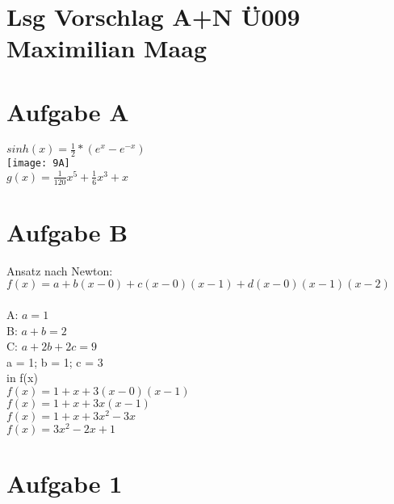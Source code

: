\documentclass{article}
\begin{document}
	\section*{Lsg Vorschlag A+N Ü009 Maximilian Maag}
	\section*{Aufgabe A}
	$sinh(x) = \frac{1}{2}*(e^x - e^{-x})$ \\
	\texttt{[image: 9A]} \\
	$g(x) = \frac{1}{120}x^5 + \frac{1}{6}x^3 + x$
	\section*{Aufgabe B}
	Ansatz nach Newton: \\
	$f(x) = a + b(x-0) + c(x-0)(x-1) + d(x-0)(x-1)(x-2)$ \\
	\\
	A: $a = 1$ \\
	B: $a + b = 2$ \\
	C: $a + 2b + 2c = 9$ \\
	a = 1; b = 1; c = 3 \\
	in f(x) \\
	$f(x) = 1 + x + 3(x-0)(x-1)$ \\
	$f(x) = 1 + x + 3x(x-1)$ \\
	$f(x) = 1 + x + 3x^2 -3x$ \\
	$f(x) = 3x^2 -2x + 1$ \\
	\section*{Aufgabe 1}
\end{document}
